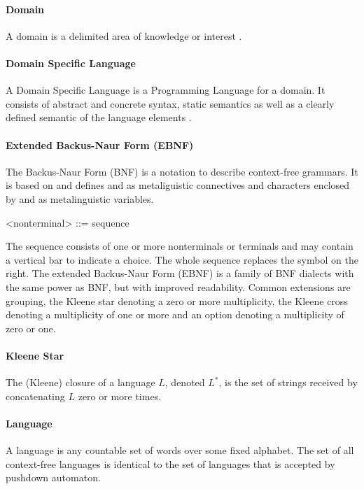 \paragraph{Domain} A domain is a delimited area of knowledge or interest \cite{MDSD}.

\paragraph{Domain Specific Language} A Domain Specific Language is a Programming Language for a domain. It consists of abstract and concrete syntax, static semantics as well as a clearly defined semantic of the language elements \cite{MDSD}.

\paragraph{Extended Backus-Naur Form (EBNF)} 
The Backus-Naur Form (BNF) is a notation to describe context-free grammars. It is based on \cite{BNF} and defines \code{:=} and \code{|} as metaliguistic connectives and characters enclosed by \code{<} and \code{>} as metalinguistic variables.
\begin{xtxt}
 <nonterminal> ::= sequence
\end{xtxt}
The sequence consists of one or more nonterminals or terminals and may contain a vertical bar to indicate a choice. The whole sequence replaces the symbol on the right. The extended Backus-Naur Form (EBNF) is a family of BNF dialects with the same power as BNF, but with improved readability. Common extensions are grouping, the Kleene star denoting a zero or more multiplicity, the Kleene cross denoting a multiplicity of one or more and an option denoting a multiplicity of zero or one. \cite{ParserBook}
 
\paragraph{Kleene Star} 
The (Kleene) closure of a language $L$, denoted $L^*$, is the set of strings received by concatenating $L$ zero or more times. \cite{DragonBook}

\paragraph{Language} 
A language is any countable set of words over some fixed alphabet. The set of all context-free languages is identical to the set of languages that is accepted by pushdown automaton. \cite{DragonBook}

